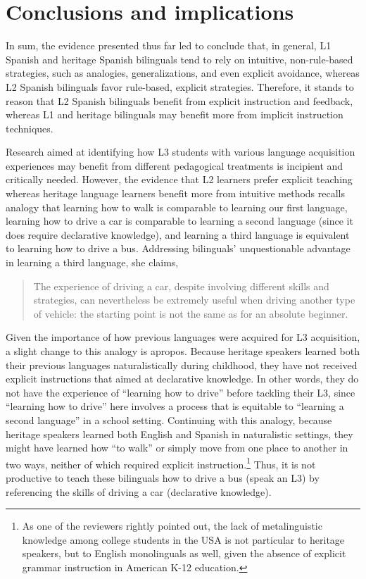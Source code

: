 \documentclass[output=paper]{../langscibook}
\begin{document}
\section{Conclusions and implications}


In sum, the evidence presented thus far led \citet{CarvalhoChild2018} to conclude that, in general, L1 Spanish and heritage Spanish bilinguals tend to rely on intuitive, non-rule-based strategies, such as analogies, generalizations, and even explicit avoidance, whereas L2 Spanish bilinguals favor rule-based, explicit strategies. Therefore, it stands to reason that L2 Spanish bilinguals benefit from explicit instruction and feedback, whereas L1 and heritage bilinguals may benefit more from implicit instruction techniques.

Research aimed at identifying how L3 students with various language acquisition experiences may benefit from different pedagogical treatments is incipient and critically needed. However, the evidence that L2 learners prefer explicit teaching whereas heritage language learners benefit more from intuitive methods recalls  analogy that learning how to walk is comparable to learning our first language, learning how to drive a car is comparable to learning a second language (since it does require declarative knowledge), and learning a third language is equivalent to learning how to drive a bus. Addressing bilinguals’ unquestionable advantage in learning a third language, she claims, 

\begin{quote}
The experience of driving a car, despite involving different skills and strategies, can nevertheless be extremely useful when driving another type of vehicle: the starting point is not the same as for an absolute beginner. \citep[73]{Cenoz2013}
\end{quote}

Given the importance of how previous languages were acquired for L3 acquisition, a slight change to this analogy is apropos. Because heritage speakers learned both their previous languages naturalistically during childhood, they have not received explicit instructions that aimed at declarative knowledge. In other words, they do not have the experience of “learning how to drive” before tackling their L3, since “learning how to drive” here involves a process that is equitable to “learning a second language” in a school setting. Continuing with this analogy, because heritage speakers learned both English and Spanish in naturalistic settings, they might have learned how “to walk” or simply move from one place to another in two ways, neither of which required explicit instruction.\footnote{As one of the reviewers rightly pointed out, the lack of metalinguistic knowledge among college students in the USA is not particular to heritage speakers, but to English monolinguals as well, given the absence of explicit grammar instruction in American K-12 education.} Thus, it is not productive to teach these bilinguals how to drive a bus (speak an L3) by referencing the skills of driving a car (declarative knowledge).
\end{document}
